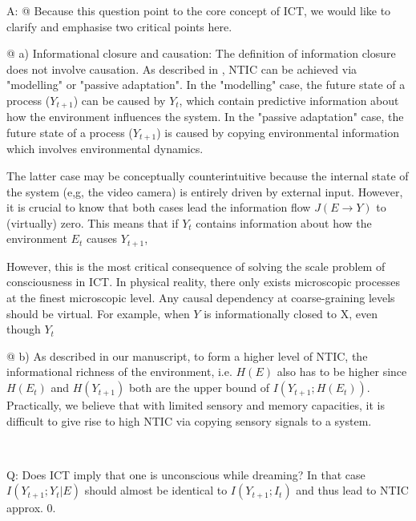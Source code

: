 \documentclass[utf8]{article}
\newcounter{cQuestion}[section]
\newenvironment{question}
    {\refstepcounter{cQuestion}\color{Blue}\noindent\newline Q\thecQuestion:}
    {~\newline}
\newenvironment{ans}  
    {\color{Black}\noindent A:}
    {~\newline}
\begin{document}
\begin{ans}
	    @ Because this question point to the core concept of ICT, we would like to clarify and emphasise two critical points here. 
	    
	    @ a) Informational closure and causation: The definition of information closure \citep{BERTSCHINGER.2006} does not involve causation. As described in \cite{BERTSCHINGER.2006}, NTIC can be achieved via "modelling" or "passive adaptation".  In the "modelling" case, the future state of a process ($Y_{t+1}$) can be caused by $Y_t$, which contain predictive information about how the environment influences the system. In the "passive adaptation" case,  the future state of a process ($Y_{t+1}$) is caused by copying environmental information which involves environmental dynamics. 
	    
	    The latter case may be conceptually counterintuitive because the internal state of the system (e,g, the video camera) is entirely driven by external input. However, it is crucial to know that both cases lead the information flow $J(E\rightarrow Y)$ to (virtually) zero. This means that if $Y_t$ contains information about how the environment $E_t$ causes $Y_{t+1}$, 
	    
	    However, this is the most critical consequence of solving the scale problem of consciousness in ICT. In physical reality, there only exists microscopic processes at the finest microscopic level. Any causal dependency at coarse-graining levels should be virtual. For example, when $Y$ is informationally closed to X, even though $Y_t$
	    
	    @ b) As described in our manuscript, to form a higher level of NTIC, the informational richness of the environment, i.e. $H(E)$ also has to be higher since $H(E_t)$ and $H(Y_{t+1})$ both are the upper bound of $I(Y_{t+1}; H(E_t))$. Practically, we believe that with limited sensory and memory capacities, it is difficult to give rise to high NTIC via copying sensory signals to a system. 
	    
	    
	    
	    
            
            
        \end{ans}
        
        \begin{question}
            Does ICT imply that one is unconscious while dreaming? In that case $I(Y_{t+1}; Y_t|E)$ should almost be identical to $I(Y_{t+1};I_t)$ and thus lead to NTIC approx. 0.        
        \end{question}
    
\end{document}
